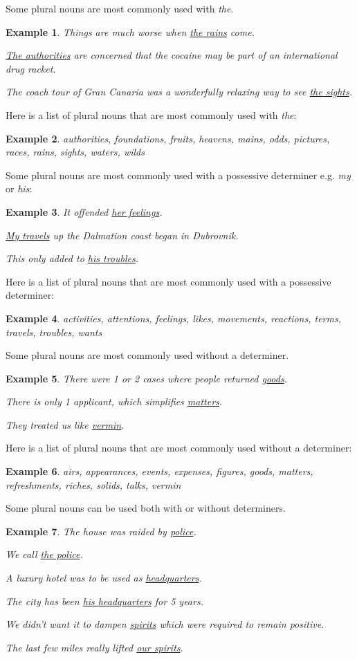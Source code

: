 \documentclass[oneside]{book}
\numberwithin{equation}{section}
\newtheorem{example}{Example}[section]
\begin{document}
%
\noindent{} Some plural nouns are most commonly used with \textit{the}.
\begin{example}
    Things are much worse when \underline{the rains} come.
    
    \underline{The authorities} are concerned that the cocaine may be part of an international drug racket.
    
    The coach tour of Gran Canaria was a wonderfully relaxing way to see \underline{the sights}.
\end{example}
Here is a list of plural nouns that are most commonly used with \textit{the}:
\begin{example}
    authorities, foundations, fruits, heavens, mains, odds, pictures, races, rains, sights, waters, wilds
\end{example}
Some plural nouns are most commonly used with a possessive determiner e.g. \textit{my} or \textit{his}:
\begin{example}
    It offended \underline{her feelings}.
    
    \underline{My travels} up the Dalmation coast began in Dubrovnik.
    
    This only added to \underline{his troubles}.
\end{example}
Here is a list of plural nouns that are most commonly used with a possessive determiner:
\begin{example}
    activities, attentions, feelings, likes, movements, reactions, terms, travels, troubles, wants
\end{example}
Some plural nouns are most commonly used without a determiner.
\begin{example}
    There were 1 or 2 cases where people returned \underline{goods}.
    
    There is only 1 applicant, which simplifies \underline{matters}.
    
    They treated us like \underline{vermin}.
\end{example}
Here is a list of plural nouns that are most commonly used without a determiner:
\begin{example}
    airs, appearances, events, expenses, figures, goods, matters, refreshments, riches, solids, talks, vermin
\end{example}
Some plural nouns can be used both with or without determiners.
\begin{example}
    The house was raided by \underline{police}.
    
    We call \underline{the police}.
    
    A luxury hotel was to be used as \underline{headquarters}.
    
    The city has been \underline{his headquarters} for 5 years.
    
    We didn't want it to dampen \underline{spirits} which were required to remain positive.
    
    The last few miles really lifted \underline{our spirits}.
\end{example}
\end{document}
